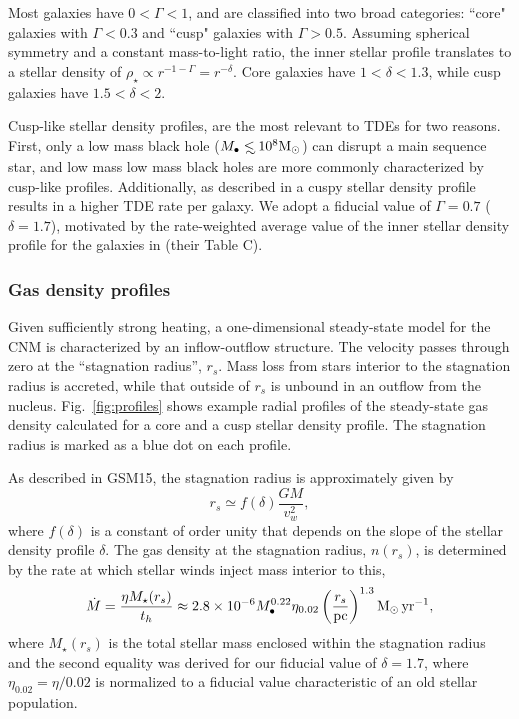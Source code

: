 \documentclass[usenatbib,fleqn]{mnras}
\newcommand\lsim{\mathrel{\rlap{\lower4pt\hbox{\hskip1pt$\sim$}}
    \raise1pt\hbox{$<$}}}
\newcommand{\Mbh}[1][]{M_{\bullet}}
\newcommand{\Msun}{{\rm M_\odot}}
\newcommand{\rs}{r_s}
\begin{document}
Most galaxies have $0<\Gamma<1$, and are classified into two broad
categories: ``core" galaxies with $\Gamma<0.3$ and ``cusp" galaxies with
$\Gamma>0.5$. Assuming spherical symmetry and a constant mass-to-light
ratio, the inner stellar profile translates to a stellar density of
$\rho_\star\propto r^{-1-\Gamma}=r^{-\delta}$. Core galaxies have
$1<\delta<1.3$, while cusp galaxies have $1.5<\delta<2$.

Cusp-like stellar density profiles, are the most relevant to TDEs for
two reasons.  First, only a low mass black hole ($\Mbh\lsim 10^8
\Msun$) can disrupt a main sequence star, and low mass low mass black
holes are more commonly characterized by cusp-like profiles.
Additionally, as described in \citet{Stone&Metzger2016} a cuspy
stellar density profile results in a higher TDE rate per galaxy.  We
adopt a fiducial value of $\Gamma=0.7$ ($\delta=1.7$), motivated by
the rate-weighted average value of the inner stellar density profile
for the galaxies in \citet{Stone&Metzger2016} (their Table C).


\subsubsection{Gas density profiles}


Given sufficiently strong heating, a one-dimensional steady-state
model for the CNM is characterized by an inflow-outflow structure.
The velocity passes through zero at the ``stagnation radius'', $\rs$.
Mass loss from stars interior to the stagnation radius is accreted,
while that outside of $\rs$ is unbound in an outflow from the nucleus.
Fig.~\ref{fig:profiles} shows example radial profiles of the
steady-state gas density calculated for a core and a cusp stellar
density profile. The stagnation radius is marked as a blue dot on each
profile.

As described in GSM15, the stagnation radius is approximately given by
\begin{equation}
r_s \simeq f(\delta) \frac{G M}{v_w^2},
\label{eq:rs}
\end{equation}
%
where $f(\delta)$ is a constant of order unity that depends on the
slope of the stellar density profile $\delta$.  The gas density at the
stagnation radius, $n(\rs)$, is determined by the rate at which
stellar winds inject mass interior to this,
\begin{equation}
  \dot{M}=\frac{\eta M_{\rm \star}(\rs)}{t_h} \approx  2.8 \times 10^{-6} \Mbh[,7]^{0.22} \eta_{0.02} \left(\frac{r_s}{\rm
      pc}\right)^{1.3} \Msun \, {\rm yr}^{-1},
\label{eq:dotM}
\end{equation}
%
where $M_{\star}(\rs)$ is the total stellar mass enclosed within the
stagnation radius and the second equality was derived for our fiducial
value of $\delta=1.7$, where $\eta_{0.02}=\eta/0.02$ is normalized to
a fiducial value characteristic of an old stellar population.
\end{document}
